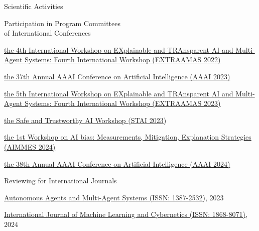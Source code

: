\documentclass{resume} %
\begin{document}
\begin{rSection}{Scientific Activities}
        \begin{rSubsection2}{Participation in Program Committees\\ of International Conferences}
            \item \href{https://extraamas.ehealth.hevs.ch/archive.html#organizations-2022}{the 4th International Workshop on EXplainable and TRAnsparent AI and Multi-Agent Systems: Fourth International Workshop (EXTRAAMAS 2022)}
            \item \href{https://apice.unibo.it/xwiki/bin/view/Event/Aaai2023}{the 37th Annual AAAI Conference on Artificial Intelligence (AAAI 2023)}
            \item \href{https://apice.unibo.it/xwiki/bin/view/Event/Prima2023}{the 5th International Workshop on EXplainable and TRAnsparent AI and Multi-Agent Systems: Fourth International Workshop (EXTRAAMAS 2023)}
            \item \href{https://web.archive.org/web/20240225110652/https://www.stai.uk/stai-23-iclp}{the Safe and Trustworthy AI Workshop (STAI 2023)}
            \item \href{https://fairnesscluster.github.io/aimmes23.github.io/index.html}{the 1st Workshop on AI bias: Measurements, Mitigation, Explanation Strategies (AIMMES 2024)}
            \item \href{https://apice.unibo.it/xwiki/bin/view/Event/Aaai2024}{the 38th Annual AAAI Conference on Artificial Intelligence (AAAI 2024)}
        \end{rSubsection2}


        \begin{rSubsection2}{Reviewing for International Journals}
            \item \href{https://link.springer.com/journal/10458}{Autonomous Agents and Multi-Agent Systems (ISSN: 1387-2532)}, 2023
            \item \href{https://link.springer.com/journal/13042}{International Journal of Machine Learning and Cybernetics (ISSN: 1868-8071)}, 2024
        \end{rSubsection2}



\end{rSection}
\end{document}
